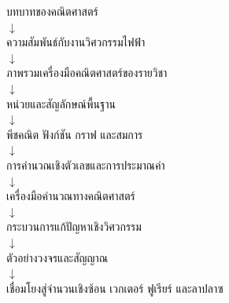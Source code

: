 \begin{center}
บทบาทของคณิตศาสตร์\\
\(\downarrow\)\\
ความสัมพันธ์กับงานวิศวกรรมไฟฟ้า\\
\(\downarrow\)\\
ภาพรวมเครื่องมือคณิตศาสตร์ของรายวิชา\\
\(\downarrow\)\\
หน่วยและสัญลักษณ์พื้นฐาน\\
\(\downarrow\)\\
พีชคณิต ฟังก์ชัน กราฟ และสมการ\\
\(\downarrow\)\\
การคำนวณเชิงตัวเลขและการประมาณค่า\\
\(\downarrow\)\\
เครื่องมือคำนวณทางคณิตศาสตร์\\
\(\downarrow\)\\
กระบวนการแก้ปัญหาเชิงวิศวกรรม\\
\(\downarrow\)\\
ตัวอย่างวงจรและสัญญาณ\\
\(\downarrow\)\\
เชื่อมโยงสู่จำนวนเชิงซ้อน เวกเตอร์ ฟูเรียร์ และลาปลาซ\\
\end{center}

